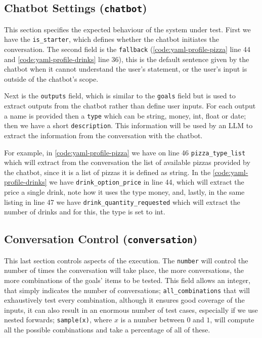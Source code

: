 \subsection{Chatbot Settings (\texttt{chatbot})}

This section specifies the expected behaviour of the system under test.
First we have the \texttt{is\_starter},
which defines whether the chatbot initiates the conversation.
The second field is the \texttt{fallback}
(\autoref{code:yaml-profile-pizza} line 44
and \autoref{code:yaml-profile-drinks} line 36),
this is the default sentence given by the chatbot
when it cannot understand the user's statement,
or the user's input is outside of the chatbot's scope.

Next is the \texttt{outputs} field, which is similar to the \texttt{goals} field
but is used to extract outputs from the chatbot rather than define user inputs.
For each output a name is provided
then a \texttt{type} which can be string, money, int, float or date;
then we have a short \texttt{description}.
This information will be used by an \ac{LLM}
to extract the information from the conversation with the chatbot.

For example, in \autoref{code:yaml-profile-pizza} we have on line 46
\texttt{pizza\_type\_list} which will extract from the conversation
the list of available pizzas provided by the chatbot,
since it is a list of pizzas it is defined as string.
In the \autoref{code:yaml-profile-drinks} we have
\texttt{drink\_option\_price} in line 44,
which will extract the price a single drink,
note how it uses the type money,
and, lastly, in the same listing in line 47
we have \texttt{drink\_quantity\_requested}
which will extract the number of drinks
and for this, the type is set to int.


\subsection{Conversation Control (\texttt{conversation})}

This last section controls aspects of the execution.
The \texttt{number} will control the number of times the conversation will take place,
the more conversations, the more combinations of the goals' items to be tested.
This field allows an integer, that simply indicates the number of conversations;
\texttt{all\_combinations} that will exhaustively test every combination,
although it ensures good coverage of the inputs,
it can also result in an enormous number of test cases,
especially if we use nested forwards;
\texttt{sample(x)}, where $x$ is a number between $0$ and $1$,
will compute all the possible combinations
and take a percentage of all of these.

